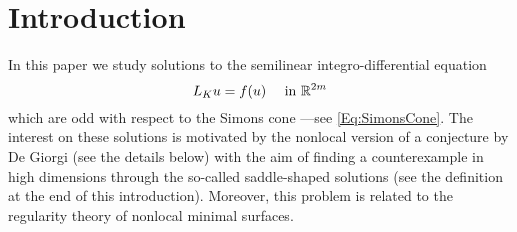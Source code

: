 \section{Introduction}
\label{Sec:Introduction}


In this paper we study solutions to the semilinear integro-differential equation
\begin{equation}
\label{Eq:NonlocalAllenCahn}
L_K u = f(u) \quad \textrm{ in } \mathbb{R}^{2m}
\end{equation}
which are odd with respect to the Simons cone ---see \eqref{Eq:SimonsCone}. The interest on these solutions is motivated by the nonlocal version of a conjecture by De Giorgi (see the details below) with the aim of finding a counterexample in high dimensions through the so-called saddle-shaped solutions (see the definition at the end of this introduction). Moreover, this problem is related to the regularity theory of nonlocal minimal surfaces.




